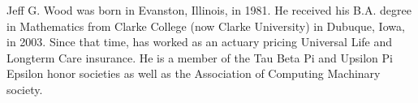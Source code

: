 

{Jeff G. Wood} was born in Evanston, Illinois, in 1981. He received
his B.A. degree in Mathematics from Clarke College (now Clarke University) in Dubuque, Iowa, in 2003.
Since that time, has worked as an actuary pricing Universal Life and Longterm Care insurance.
He is a member of the Tau Beta Pi and Upsilon Pi Epsilon honor societies as well as the Association of Computing Machinary society.
